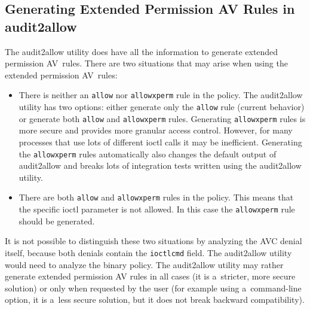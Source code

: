\subsection{Generating Extended Permission AV Rules in audit2allow}
The audit2allow utility does have all the information to generate extended
permission AV~rules. There are two situations that may arise when using the
extended permission AV~rules:
\begin{itemize}
    \item There is neither an \texttt{allow} nor \texttt{allowxperm} rule in the
        policy. The audit2allow utility has two options: either generate only
        the \texttt{allow} rule (current behavior) or generate both
        \texttt{allow} and \texttt{allowxperm} rules. Generating
        \texttt{allowxperm} rules is more secure and provides more granular
        access control. However, for many processes that use lots of different
        ioctl calls it may be inefficient.  Generating the \texttt{allowxperm}
        rules automatically also changes the default output of audit2allow and
        breaks lots of integration tests written using the audit2allow utility.
    \item There are both \texttt{allow} and \texttt{allowxperm} rules in the
        policy. This means that the specific ioctl parameter is not allowed. In
        this case the \texttt{allowxperm} rule should be generated.
\end{itemize}

It is not possible to distinguish these two situations by analyzing the AVC
denial itself, because both denials contain the \texttt{ioctlcmd} field. The
audit2allow utility would need to analyze the binary policy. The audit2allow
utility may rather generate extended permission AV rules in all cases (it is
a~stricter, more secure solution) or only when requested by the user (for
example using a~command-line option, it is a~less secure solution, but it does
not break backward compatibility).

